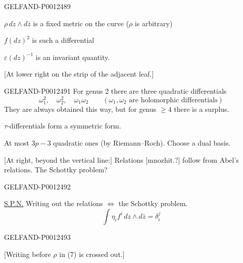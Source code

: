 \begin{GelfandAdjacentEvidence}{GELFAND-P001248}{9}


$\rho\,dz\wedge d\bar z$ is a fixed metric on the curve ($\rho$ is arbitrary)

$f(dz)^2$ is such a differential

$\varepsilon(dz)^{-1}$ is an invariant quantity.

[At lower right on the strip of the adjacent leaf.]
\end{GelfandAdjacentEvidence}



\begin{GelfandAdjacentEvidence}{GELFAND-P001249}{1}
For genus 2 there are three quadratic differentials
\begin{equation*}
\omega_1^2,\quad \omega_2^2,\quad \omega_1\omega_2
\qquad (\omega_1,\omega_2\text{ are holomorphic differentials})
\end{equation*}
They are always obtained this way, but for genus $\geq4$ there is a surplus.

$\tau$-differentials form a symmetric form.

At most $3p-3$ quadratic ones (by Riemann–Roch).
Choose a dual basis.

[At right, beyond the vertical line:] Relations [mnozhit.?] follow from Abel’s relations. The Schottky problem?
\end{GelfandAdjacentEvidence}
\begin{GelfandAdjacentEvidence}{GELFAND-P001249}{2}


\underline{S.P.N.} Writing out the relations $\Leftrightarrow$ the Schottky problem.
\begin{equation*}
\int \eta_i f^i\,dz\wedge d\bar z=\delta_i^j\tag{6}
\end{equation*}
\end{GelfandAdjacentEvidence}
\begin{GelfandAdjacentEvidence}{GELFAND-P001249}{3}


[Writing before $\rho$ in (7) is crossed out.]
\end{GelfandAdjacentEvidence}
